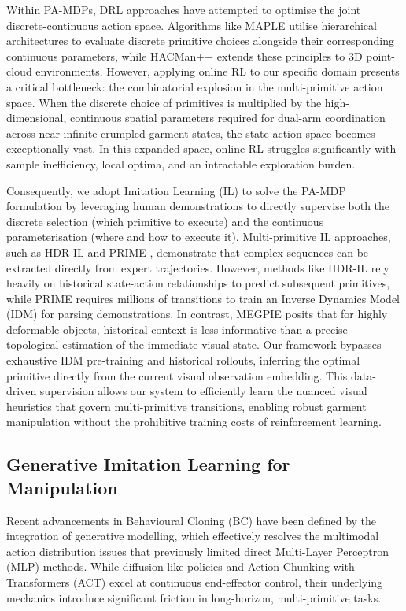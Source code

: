 \documentclass[journal]{IEEEtran}
\begin{document}
Within PA-MDPs, DRL approaches have attempted to optimise the joint discrete-continuous action space. Algorithms like MAPLE \cite{nasiriany2022augmenting} utilise hierarchical architectures to evaluate discrete primitive choices alongside their corresponding continuous parameters, while HACMan++ \cite{jiang2024hacman++} extends these principles to 3D point-cloud environments. However, applying online RL to our specific domain presents a critical bottleneck: the combinatorial explosion in the multi-primitive action space. When the discrete choice of primitives is multiplied by the high-dimensional, continuous spatial parameters required for dual-arm coordination across near-infinite crumpled garment states, the state-action space becomes exceptionally vast. In this expanded space, online RL struggles significantly with sample inefficiency, local optima, and an intractable exploration burden.

Consequently, we adopt Imitation Learning (IL) to solve the PA-MDP formulation by leveraging human demonstrations to directly supervise both the discrete selection (which primitive to execute) and the continuous parameterisation (where and how to execute it). Multi-primitive IL approaches, such as HDR-IL \cite{xie2020deep} and PRIME \cite{gao2024prime}, demonstrate that complex sequences can be extracted directly from expert trajectories. However, methods like HDR-IL rely heavily on historical state-action relationships to predict subsequent primitives, while PRIME requires millions of transitions to train an Inverse Dynamics Model (IDM) for parsing demonstrations. In contrast, MEGPIE posits that for highly deformable objects, historical context is less informative than a precise topological estimation of the immediate visual state. Our framework bypasses exhaustive IDM pre-training and historical rollouts, inferring the optimal primitive directly from the current visual observation embedding. This data-driven supervision allows our system to efficiently learn the nuanced visual heuristics that govern multi-primitive transitions, enabling robust garment manipulation without the prohibitive training costs of reinforcement learning.

\subsection{Generative Imitation Learning for Manipulation}
\label{sec:diffusion_policies}

Recent advancements in Behavioural Cloning (BC) have been defined by the integration of generative modelling, which effectively resolves the multimodal action distribution issues that previously limited direct Multi-Layer Perceptron (MLP) methods. While diffusion-like policies \cite{chi2025diffusion} and Action Chunking with Transformers (ACT) \cite{zhao2023learning} excel at continuous end-effector control, their underlying mechanics introduce significant friction in long-horizon, multi-primitive tasks.
\end{document}
